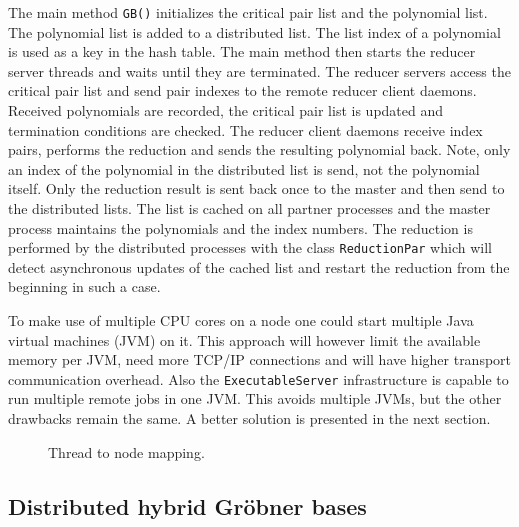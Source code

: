 \documentclass[10pt,twocolumn,a4paper]{article}
\newcommand{\code}[1]{\texttt{#1}}
\begin{document}
The main method \code{GB()} initializes the critical pair list and the
polynomial list.  The polynomial list is added to a distributed list.
The list index of a polynomial is used as a key in the hash table. The
main method then starts the reducer server threads and waits until
they are terminated.  The reducer servers access the critical pair
list and send pair indexes to the remote reducer client daemons.
Received polynomials are recorded, the critical pair list is updated
and termination conditions are checked.  The reducer client daemons
receive index pairs, performs the reduction and sends the resulting
polynomial back.  Note, only an index of the polynomial in the
distributed list is send, not the polynomial itself.  Only the
reduction result is sent back once to the master and then send to the
distributed lists.  The list is cached on all partner processes and
the master process maintains the polynomials and the index numbers.
The reduction is performed by the distributed processes with the class
\code{Reduction\-Par} which will detect asynchronous updates of the
cached list and restart the reduction from the beginning in such a
case.  

To make use of multiple CPU cores on a node one could start multiple
Java virtual machines (JVM) on it. This approach will however limit
the available memory per JVM, need more TCP/IP connections and will
have higher transport communication overhead.  Also the
\code{Executable\-Server} infrastructure is capable to run multiple
remote jobs in one JVM. This avoids multiple JVMs, but the other
drawbacks remain the same. A better solution is presented in the next
section.


\begin{figure}[thb]
\centering
{}
\caption{Thread to node mapping.}
\label{fig:threadnode}
\end{figure}

\subsection{Distributed hybrid Gr\"ob\-ner ba\-ses} 
\end{document}
